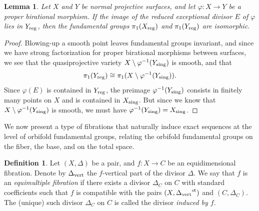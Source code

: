\documentclass{amsart}
\newtheorem{lemma}[theorem]{Lemma}
\theoremstyle{definition}
\newtheorem{definition}[theorem]{Definition}
\theoremstyle{remark}
\numberwithin{equation}{section}
\begin{document}
\begin{lemma}\label{lem:fun-under-surj-smooth}
Let $X$ and $Y$ be normal projective surfaces, and let $\varphi\colon X\rightarrow Y$ be a proper birational morphism. 
If the image of the reduced exceptional divisor $E$ of $\varphi$ lies in $Y_{\rm reg}$, then the fundamental groups $\pi_1(X_{\rm reg})$ and $\pi_1(Y_{\rm reg})$ are isomorphic.
\end{lemma}

\begin{proof}
    Blowing-up a smooth point leaves fundamental groups invariant, and since we have strong factorization for proper birational morphisms between surfaces, we see that the quasiprojective variety $X\setminus\varphi^{-1}(Y_{\rm sing})$ is smooth, and that
    $$\pi_1(Y_{\rm reg}) \cong \pi_1(X\setminus\varphi^{-1}(Y_{\rm sing})).$$
    Since $\varphi(E)$ is contained in $Y_{\rm reg}$, the preimage $\varphi^{-1}(Y_{\rm sing})$ consists in finitely many points on $X$ and is contained in $X_{\rm sing}$. But since we know that $X\setminus\varphi^{-1}(Y_{\rm sing})$ is smooth, we must have $\varphi^{-1}(Y_{\rm sing})=X_{\rm sing}$.
\end{proof}

We now present a type of fibrations that naturally induce exact sequences at the level of orbifold fundamental groups, relating the orbifold fundamental groups on the fiber, the base, and on the total space.

\begin{definition}\label{def:mult-divisor}
    Let $(X,\Delta)$ be a pair, and $f: X\to C$ be an equidimensional fibration. Denote by $\Delta_{\rm vert}$ the $f$-vertical part of the divisor $\Delta$. We say that $f$ is an {\it equimultiple fibration} if there exists a divisor $\Delta_C$ on $C$ with standard coefficients such that $f$ is compatible with the pairs $(X,{\Delta_{\mathrm{vert}}}^{\rm st})$ and $(C,\Delta_C)$.
    The (unique) such divisor $\Delta_C$ on $C$ is called the divisor {\it induced by $f$}.
\end{definition}
\end{document}

